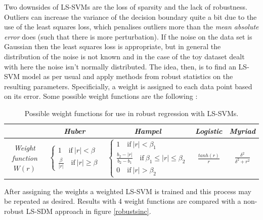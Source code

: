 Two downsides of LS-SVMs are the loss of sparsity and the lack of robustness. Outliers can increase the variance of the decision boundary quite a bit due to the use of the least squares loss, which penalises outliers more than the \textit{mean absolute error} does (such that there is more perturbation). If the noise on the data set is Gaussian then the least squares loss is appropriate, but in general the distribution of the noise is not known and in the case of the toy dataset dealt with here the noise isn't normally distributed. The idea, then, is to find an LS-SVM model as per usual and apply methods from robust statistics on the resulting parameters. Specificially, a weight is assigned to each data point based on its error. Some possible weight functions are the following :
\vspace{0.2cm}
\begin{table}[h]
\centering
\begin{tabular}{c|cccc}
& \textit{Huber} & \textit{Hampel} & \textit{Logistic} & \textit{Myriad}\\
\hline
\textit{Weight function} $W(r)$ & $\begin{cases}1\quad\text{if}\ |r|<\beta\\\frac{\beta}{|r|}\quad\text{if}\ |r|\geq\beta\end{cases}$ & $\begin{cases}1\quad\text{if}\ |r|<\beta_1\\\frac{b_2-|r|}{b_2-b_1}\quad\text{if}\ \beta_1\leq|r|\leq\beta_2\\0\quad\text{if}\ |r|>\beta_2\end{cases}$ & $\frac{tanh(r)}{r}$ & $\frac{\delta^2}{\delta^2+r^2}$\\
\end{tabular}
\caption{Possible weight functions for use in robust regression with LS-SVMs.}
\label{roburegwf}
\end{table}
\vspace{0.2cm}
After assigning the weights a weighted LS-SVM is trained and this process may be repeated as desired. Results with 4 weight functions are compared with a non-robust LS-SDM approach in figure \ref{robustsinc}.

